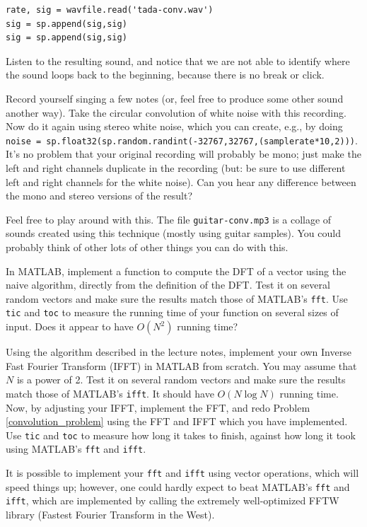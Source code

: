 \begin{lstlisting}
rate, sig = wavfile.read('tada-conv.wav')
sig = sp.append(sig,sig)
sig = sp.append(sig,sig)
\end{lstlisting}

Listen to the resulting sound, and notice that we are not able to identify where the sound loops back to the beginning, because there is no break or click.

\begin{problem}
Record yourself singing a few notes (or, feel free to produce some other sound another way). Take the circular convolution of white noise with this recording. Now do it again using stereo white noise, which you can create, e.g., by doing \texttt{noise = sp.float32(sp.random.randint(-32767,32767,(samplerate*10,2)))}. It's no problem that your original recording will probably be mono; just make the left and right channels duplicate in the recording (but: be sure to use different left and right channels for the white noise). Can you hear any difference between the mono and stereo versions of the result?
\end{problem}

Feel free to play around with this. The file \texttt{guitar-conv.mp3} is a collage of sounds created using this technique (mostly using guitar samples). You could probably think of other lots of other things you can do with this.

\begin{problem}
In MATLAB, implement a function to compute the DFT of a vector using the naive algorithm, directly from the definition of the DFT. Test it on several random vectors and make sure the results match those of MATLAB's \texttt{fft}. Use \texttt{tic} and \texttt{toc} to measure the running time of your function on several sizes of input. Does it appear to have $O(N^2)$ running time?
\end{problem}

\begin{problem}
Using the algorithm described in the lecture notes, implement your own Inverse Fast Fourier Transform (IFFT) in MATLAB from scratch. You may assume that $N$ is a power of 2. Test it on several random vectors and make sure the results match those of MATLAB's \texttt{ifft}. It should have $O(N\log N)$ running time. Now, by adjusting your IFFT, implement the FFT, and redo Problem \ref{convolution_problem} using the FFT and IFFT which you have implemented. Use \texttt{tic} and \texttt{toc} to measure how long it takes to finish, against how long it took using MATLAB's \texttt{fft} and \texttt{ifft}.
\end{problem}

It is possible to implement your \texttt{fft} and \texttt{ifft} using vector operations, which will speed things up; however, one could hardly expect to beat MATLAB's \texttt{fft} and \texttt{ifft}, which are implemented by calling the extremely well-optimized FFTW library (Fastest Fourier Transform in the West).



